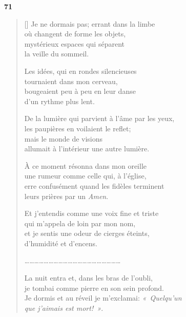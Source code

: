 \documentclass[a4paper,12pt]{book}
\begin{document}
\bigskip

\begin{center}
  \textbf{71}
\end{center}


\begin{verse}[\versewidth]
  Je ne dormais pas; errant dans la limbe \\
  où changent de forme les objets, \\
  mystérieux espaces qui séparent \\
  la veille du sommeil.

  Les idées, qui en rondes silencieuses \\
  tournaient dans mon cerveau, \\
  bougeaient peu à peu en leur danse \\
  d'un rythme plus lent.

  De la lumière qui parvient à l'âme par les yeux, \\
  les paupières en voilaient le reflet; \\
  mais le monde de visions \\
  allumait à l'intérieur une autre lumière.

  À ce moment résonna dans mon oreille \\
  une rumeur comme celle qui, à l'église, \\
  erre confusément quand les fidèles terminent \\
  leurs prières par un \emph{Amen}.

  Et j'entendis comme une voix fine et triste \\
  qui m'appela de loin par mon nom, \\
  et je sentis une odeur de cierges éteints, \\
  d'humidité et d'encens.

\ldots\ldots\ldots\ldots\ldots\ldots\ldots\ldots\ldots\ldots\ldots\ldots\ldots\ldots\ldots\ldots\ldots\ldots\ldots\ldots

  La nuit entra et, dans les bras de l'oubli, \\
  je tombai comme pierre en son sein profond. \\
  Je dormis et au réveil je m'exclamai: \emph{«~Quelqu'un \\
que j'aimais est mort!~»}.
\end{verse}
\end{document}

